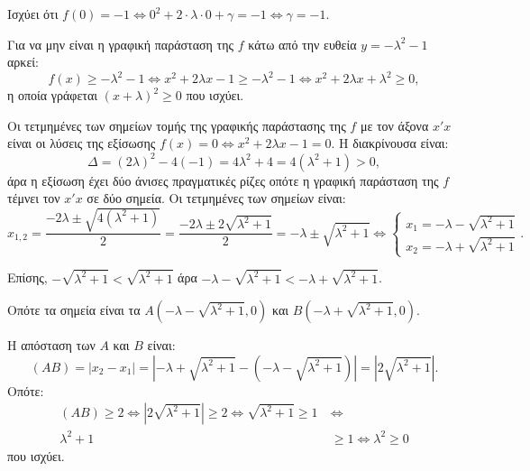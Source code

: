 
\begin{alist}
\item 
\begin{rlist}
\item Ισχύει ότι $f(0) = -1 \Leftrightarrow 0^2 + 2 \cdot \lambda \cdot 0 + \gamma = -1 \Leftrightarrow \gamma = -1$.
\item Για να μην είναι η γραφική παράσταση της $f$ κάτω από την ευθεία $y = -\lambda^2 - 1$ αρκεί:
\[f(x) \ge -\lambda^2 - 1 \Leftrightarrow x^2 + 2\lambda x - 1 \ge -\lambda^2 - 1 \Leftrightarrow x^2 + 2\lambda x + \lambda^2 \ge 0,\]
η οποία γράφεται $(x + \lambda)^2 \ge 0$ που ισχύει.
\end{rlist}

\item Οι τετμημένες των σημείων τομής της γραφικής παράστασης της $f$ με τον άξονα $x'x$ είναι οι λύσεις της εξίσωσης $f(x) = 0 \Leftrightarrow x^2 + 2\lambda x - 1 = 0$.
Η διακρίνουσα είναι:
\[\Delta = (2\lambda)^2 - 4(-1) = 4\lambda^2 + 4 = 4(\lambda^2 + 1) > 0,\]
άρα η εξίσωση έχει δύο άνισες πραγματικές ρίζες οπότε η γραφική παράσταση της $f$ τέμνει τον $x'x$ σε δύο σημεία.
Οι τετμημένες των σημείων είναι:
\[x_{1,2} = \dfrac{-2\lambda \pm \sqrt{4(\lambda^2 + 1)}}{2} = \dfrac{-2\lambda \pm 2\sqrt{\lambda^2 + 1}}{2} = -\lambda \pm \sqrt{\lambda^2 + 1} \Leftrightarrow \begin{cases} x_1 = -\lambda - \sqrt{\lambda^2 + 1} \\ x_2 = -\lambda + \sqrt{\lambda^2 + 1} \end{cases}.\]

Επίσης, $-\sqrt{\lambda^2 + 1} < \sqrt{\lambda^2 + 1}$ άρα $-\lambda - \sqrt{\lambda^2 + 1} < -\lambda + \sqrt{\lambda^2 + 1}$.

Οπότε τα σημεία είναι τα $A(-\lambda - \sqrt{\lambda^2 + 1}, 0)$ και $B(-\lambda + \sqrt{\lambda^2 + 1}, 0)$.

\item Η απόσταση των $A$ και $B$ είναι:
\[(AB) = |x_2 - x_1| = |-\lambda + \sqrt{\lambda^2 + 1} - (-\lambda - \sqrt{\lambda^2 + 1})| = |2\sqrt{\lambda^2 + 1}|.\]
Οπότε:
\begin{align*}
(AB) \ge 2 \Leftrightarrow |2\sqrt{\lambda^2 + 1}| \ge 2 \Leftrightarrow \sqrt{\lambda^2 + 1} \ge 1 \ &\Leftrightarrow \\
\lambda^2 + 1 &\ge 1 \Leftrightarrow \lambda^2 \ge 0
\end{align*}
που ισχύει.
\end{alist}

